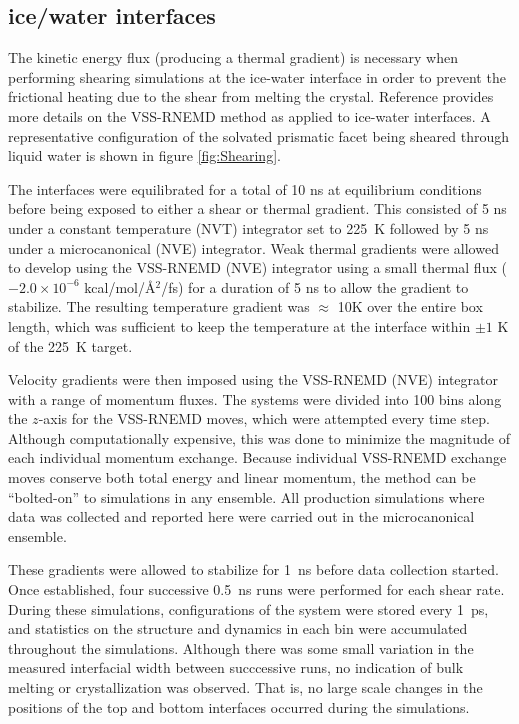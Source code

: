 \documentclass[aps,jcp,preprint,showpacs,superscriptaddress,groupedaddress]{revtex4}  %
\begin{document}
\subsection{ice/water interfaces}
The kinetic energy flux (producing a thermal gradient) is necessary
when performing shearing simulations at the ice-water interface in
order to prevent the frictional heating due to the shear from melting
the crystal. Reference \citealp{Louden13} provides more details on the
VSS-RNEMD method as applied to ice-water interfaces. A representative
configuration of the solvated prismatic facet being sheared through
liquid water is shown in figure \ref{fig:Shearing}. 

The interfaces were equilibrated for a total of 10 ns at equilibrium
conditions before being exposed to either a shear or thermal gradient.
This consisted of 5 ns under a constant temperature (NVT) integrator
set to 225~K followed by 5 ns under a microcanonical (NVE) integrator.
Weak thermal gradients were allowed to develop using the VSS-RNEMD
(NVE) integrator using a small thermal flux ($-2.0\times 10^{-6}$
kcal/mol/\AA$^2$/fs) for a duration of 5 ns to allow the gradient to
stabilize.  The resulting temperature gradient was $\approx$ 10K over
the entire box length, which was sufficient to keep the temperature at
the interface within $\pm 1$ K of the 225~K target.

Velocity gradients were then imposed using the VSS-RNEMD (NVE)
integrator with a range of momentum fluxes. The systems were divided
into 100 bins along the $z$-axis for the VSS-RNEMD moves, which were
attempted every time step.  Although computationally expensive, this
was done to minimize the magnitude of each individual momentum
exchange.  Because individual VSS-RNEMD exchange moves conserve both
total energy and linear momentum, the method can be ``bolted-on'' to
simulations in any ensemble.  All production simulations where data was 
collected and reported here were carried out in the microcanonical ensemble.

These gradients were allowed to stabilize for 1~ns before data
collection started. Once established, four successive 0.5~ns runs were
performed for each shear rate.  During these simulations,
configurations of the system were stored every 1~ps, and statistics on
the structure and dynamics in each bin were accumulated throughout the
simulations.  Although there was some small variation in the measured
interfacial width between succcessive runs, no indication of bulk
melting or crystallization was observed.  That is, no large scale
changes in the positions of the top and bottom interfaces occurred
during the simulations.
\end{document}
